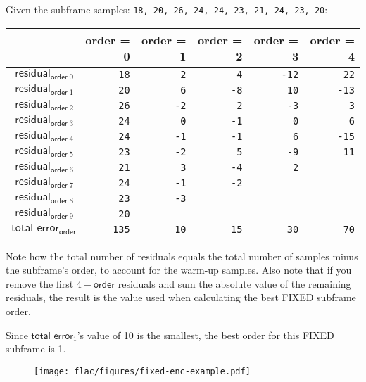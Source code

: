 Given the subframe samples: \texttt{18, 20, 26, 24, 24, 23, 21, 24, 23, 20}:
\begin{table}[h]
\begin{tabular}{r|r|r|r|r|r}
& \textsf{order} = 0 & \textsf{order} = 1 & \textsf{order} = 2 & \textsf{order} = 3 & \textsf{order} = 4 \\
\hline
$\textsf{residual}_{\textsf{order}~0}$ & \texttt{\color{gray}18} & \texttt{\color{gray}2} & \texttt{\color{gray}4} & \texttt{\color{gray}-12} & \texttt{22} \\
$\textsf{residual}_{\textsf{order}~1}$ & \texttt{\color{gray}20} & \texttt{\color{gray}6} & \texttt{\color{gray}-8} & \texttt{10} & \texttt{-13} \\
$\textsf{residual}_{\textsf{order}~2}$ & \texttt{\color{gray}26} & \texttt{\color{gray}-2} & \texttt{2} & \texttt{-3} & \texttt{3} \\
$\textsf{residual}_{\textsf{order}~3}$ & \texttt{\color{gray}24} & \texttt{0} & \texttt{-1} & \texttt{0} & \texttt{6} \\
$\textsf{residual}_{\textsf{order}~4}$ & \texttt{24} & \texttt{-1} & \texttt{-1} & \texttt{6} & \texttt{-15} \\
$\textsf{residual}_{\textsf{order}~5}$ & \texttt{23} & \texttt{-2} & \texttt{5} & \texttt{-9} & \texttt{11} \\
$\textsf{residual}_{\textsf{order}~6}$ & \texttt{21} & \texttt{3} & \texttt{-4} & \texttt{2} \\
$\textsf{residual}_{\textsf{order}~7}$ & \texttt{24} & \texttt{-1} & \texttt{-2} \\
$\textsf{residual}_{\textsf{order}~8}$ & \texttt{23} & \texttt{-3} \\
$\textsf{residual}_{\textsf{order}~9}$ & \texttt{20} \\
\hline
$\textsf{total error}_{\textsf{order}}$ & \texttt{135} & \texttt{10} & \texttt{15} & \texttt{30} & \texttt{70} \\
\end{tabular}
\end{table}
\par
\noindent
Note how the total number of residuals equals the
total number of samples minus the subframe's order,
to account for the warm-up samples.
Also note that if you remove the first $4 - \textsf{order}$ residuals
and sum the absolute value of the remaining residuals,
the result is the  value
used when calculating the best FIXED subframe order.
\par
Since $\textsf{total error}_1$'s value of 10 is the smallest,
the best order for this FIXED subframe is 1.

\begin{figure}[h]
  \texttt{[image: flac/figures/fixed-enc-example.pdf]}
\end{figure}
